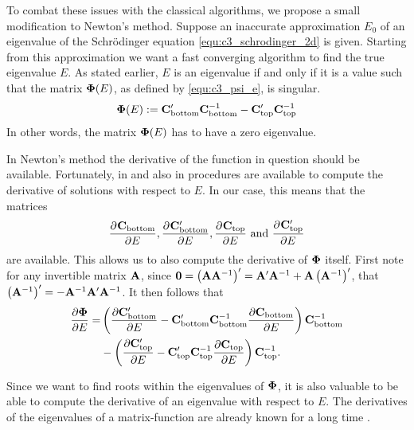 To combat these issues with the classical algorithms, we propose a small modification to Newton's method. Suppose an inaccurate approximation $E_0$ of an eigenvalue of the Schrödinger equation \eqref{equ:c3_schrodinger_2d} is given. Starting from this approximation we want a fast converging algorithm to find the true eigenvalue $E$. As stated earlier, $E$ is an eigenvalue if and only if it is a value such that the matrix $\vb{\Phi}(E)$, as defined by \eqref{equ:c3_psi_e}, is singular.
$$
  \vb{\Phi}(E) := \vb{C}_\text{bottom}'\vb{C}_\text{bottom}^{-1} - \vb{C}_\text{top}'\vb{C}_\text{top}^{-1}
$$
In other words, the matrix $\vb{\Phi}(E)$ has to have a zero eigenvalue.

In Newton's method the derivative of the function in question should be available. Fortunately, in \cite{ixaru_lilix_2002} and also in \cite{ledoux_cpmp_2006} procedures are available to compute the derivative of solutions with respect to $E$. In our case, this means that the matrices
$$
  \pdv[]{\vb{C}_\text{bottom}}{E}, \pdv[]{\vb{C}_\text{bottom}'}{E}, \pdv[]{\vb{C}_\text{top}}{E} \text{ and } \pdv[]{\vb{C}_\text{top}'}{E}
$$
are available. This allows us to also compute the derivative of $\vb{\Phi}$ itself. First note for any invertible matrix $\vb{A}$, since $\vb{0} = \left(\vb{A}\vb{A}^{-1}\right)' = \vb{A}' \vb{A}^{-1} + \vb{A} \left(\vb{A}^{-1}\right)'$, that $\left(\vb{A}^{-1}\right)' = -\vb{A}^{-1} \vb{A}' \vb{A}^{-1}$. It then follows that
\begin{align*}
  \pdv{\vb{\Phi}}{E} = & \left(\pdv{\vb{C}_\text{bottom}'}{E} - \vb{C}_\text{bottom}'\vb{C}_\text{bottom}^{-1}\pdv{\vb{C}_\text{bottom}}{E}\right) \vb{C}_\text{bottom}^{-1} \\
                       & - \left(\pdv{\vb{C}_\text{top}'}{E} - \vb{C}_\text{top}'\vb{C}_\text{top}^{-1}\pdv{\vb{C}_\text{top}}{E}\right) \vb{C}_\text{top}^{-1}\text{.}
\end{align*}

Since we want to find roots within the eigenvalues of $\vb{\Phi}$, it is also valuable to be able to compute the derivative of an eigenvalue with respect to $E$. The derivatives of the eigenvalues of a matrix-function are already known for a long time \cite{lancaster_eigenvalues_1964}.

